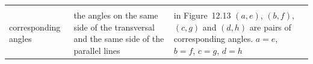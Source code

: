 \begin{center}
\begin{xtabular*}{\mytablewidth}[t]{|p{3cm}|p{3cm}|p{3cm}|p{20\mystarwidth}|}
\begin{center}
      \vspace{2pt}
    \vspace{.1in}
    \end{center}    
     \tabularnewline{}
        corresponding angles &
        the angles on the same side of the transversal and the same side of the parallel lines &
        in Figure~12.13 $\left(a,e\right)$, \begin{math}\left(b,f\right)\end{math}, \begin{math}\left(c,g\right)\end{math} and \begin{math}\left(d,h\right)\end{math} are pairs of corresponding angles.  \begin{math}a=e\end{math}, \begin{math}b=f\end{math}, \begin{math}c=g\end{math}, \begin{math}d=h\end{math} &
    \setcounter{subfigure}{0}
\label{m39370*id317099}
    \begin{center}

\end{center}
\end{xtabular*}
\end{center}
